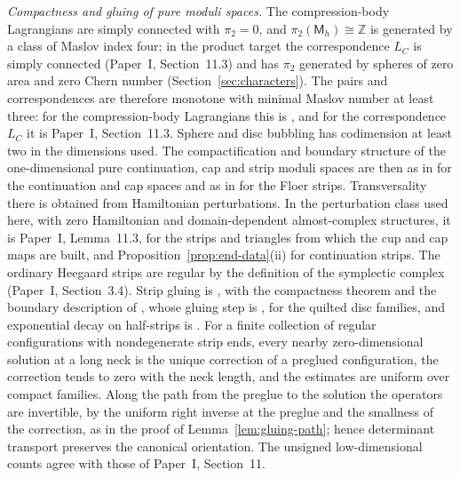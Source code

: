 \documentclass[11pt]{amsart}
\theoremstyle{definition}
\theoremstyle{remark}
\theoremstyle{plain}
\numberwithin{equation}{section}
\newcommand{\ZZ}{\mathbb Z}
\newcommand{\Msf}{\mathsf M}
\begin{document}
\emph{Compactness and gluing of pure moduli spaces.} The compression-body
Lagrangians are simply connected with $\pi_2=0$, and $\pi_2(\Msf_h)\cong\ZZ$
is generated by a class of Maslov index four; in the product target the
correspondence $L_C$ is simply connected (Paper~I, Section~11.3) and has
$\pi_2$ generated by spheres of zero area and zero Chern number
(Section~\ref{sec:characters}). The pairs and correspondences are
therefore monotone with minimal Maslov number at least three: for the
compression-body Lagrangians this is \cite[Proposition~2.27]{DFL}, and for
the correspondence $L_C$ it is Paper~I, Section~11.3. Sphere and disc bubbling has
codimension at least two in the dimensions used. The compactification
and boundary structure of the one-dimensional pure continuation, cap and
strip moduli spaces are then as in \cite[Theorem~3.9(c)]{WW-relative}
for the continuation and cap spaces and as in
\cite[Theorem~4.2.3(c)]{WW-quilt} for the Floer strips.
Transversality there is obtained from Hamiltonian perturbations. In the
perturbation class used here, with zero Hamiltonian and
domain-dependent almost-complex structures, it is Paper~I,
Lemma~11.3, for the strips and triangles from which the cup and cap
maps are built, and Proposition~\ref{prop:end-data}(ii) for
continuation strips. The ordinary Heegaard strips are regular by the
definition of the symplectic complex (Paper~I, Section~3.4). Strip gluing
is \cite[Theorems~5.4.1, 5.4.3, 5.4.5 and~5.4.8]{Simcevic},
with the compactness theorem \cite[Theorem~3.3]{MWW} and the
boundary description of \cite[Theorem~3.7]{MWW}, whose gluing step is
\cite{Mau}, for the quilted disc families, and exponential decay on half-strips is
\cite[Corollary~2.3.2]{Simcevic}. For a finite collection of regular
configurations with nondegenerate strip ends, every nearby
zero-dimensional solution at a long neck is the unique correction of a
preglued configuration, the correction tends to zero with the neck
length, and the estimates are uniform over compact families. Along the
path from the preglue to the solution the operators are invertible, by
the uniform right inverse at the preglue and the smallness of the
correction, as in the proof of Lemma~\ref{lem:gluing-path}; hence
determinant transport preserves the canonical orientation. The unsigned
low-dimensional counts agree with those of Paper~I, Section~11.
\end{document}
